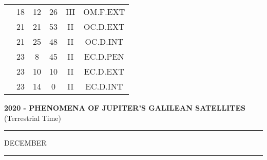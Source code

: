 \documentclass[12pt, a4paper]{article}
\begin{document}
\begin{multicols}{3}
{\begin{tabular}{c c c c c c}
	 	 	 	 & 18 & 12 & 26 & III & OM.F.EXT\\%
	 	 	 	 & 21 & 21 & 53 & II & OC.D.EXT\\%
	 	 	 	 & 21 & 25 & 48 & II & OC.D.INT\\%
	 	 	 	 & 23 & 8 & 45 & II & EC.D.PEN\\%
	 	 	 	 & 23 & 10 & 10 & II & EC.D.EXT\\%
	 	 	 	 & 23 & 14 & 0 & II & EC.D.INT\\%
	 	 \end{tabular}
 	}
\end{multicols}
\textbf{2020 - PHENOMENA OF JUPITER'S GALILEAN SATELLITES}\\(Terrestrial Time) 
\vspace{0.1cm} \hrule \vspace{0.1cm}
DECEMBER\vspace{0.1cm}
\hrule
\vspace{-0.2cm}
\end{document}
